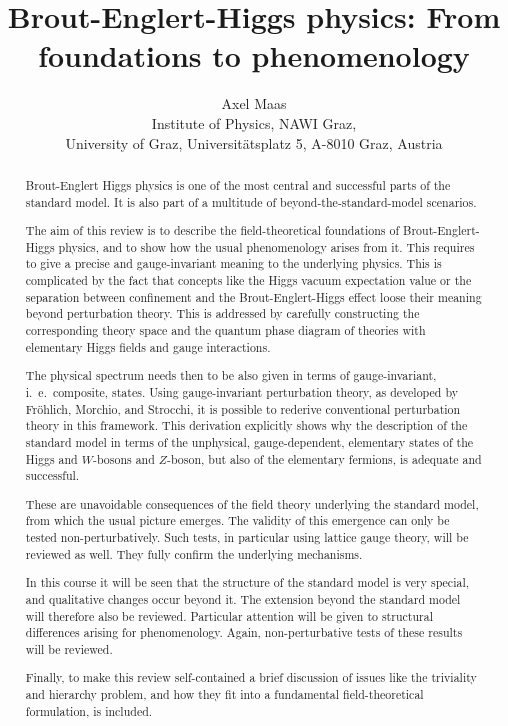\documentclass[final,twoside,12pt]{article}
\newcommand*{\1}{1\!\!\!\bot}
\begin{document}
 
\title{Brout-Englert-Higgs physics: From foundations to phenomenology}%

\author{Axel Maas\\
Institute of Physics, NAWI Graz,\\ University of Graz, Universit\"atsplatz 5, A-8010 Graz, Austria}

\maketitle

\begin{abstract}

Brout-Englert Higgs physics is one of the most central and successful parts of the standard model. It is also part of a multitude of beyond-the-standard-model scenarios.

The aim of this review is to describe the field-theoretical foundations of Brout-Englert-Higgs physics, and to show how the usual phenomenology arises from it. This requires to give a precise and gauge-invariant meaning to the underlying physics. This is complicated by the fact that concepts like the Higgs vacuum expectation value or the separation between confinement and the Brout-Englert-Higgs effect loose their meaning beyond perturbation theory. This is addressed by carefully constructing the corresponding theory space and the quantum phase diagram of theories with elementary Higgs fields and gauge interactions.

The physical spectrum needs then to be also given in terms of gauge-invariant, i.\ e.\ composite, states. Using gauge-invariant perturbation theory, as developed by Fr\"ohlich, Morchio, and Strocchi, it is possible to rederive conventional perturbation theory in this framework. This derivation explicitly shows why the description of the standard model in terms of the unphysical, gauge-dependent, elementary states of the Higgs and $W$-bosons and $Z$-boson, but also of the elementary fermions, is adequate and successful.

These are unavoidable consequences of the field theory underlying the standard model, from which the usual picture emerges. The validity of this emergence can only be tested non-perturbatively. Such tests, in particular using lattice gauge theory, will be reviewed as well. They fully confirm the underlying mechanisms.

In this course it will be seen that the structure of the standard model is very special, and qualitative changes occur beyond it. The extension beyond the standard model will therefore also be reviewed. Particular attention will be given to structural differences arising for phenomenology. Again, non-perturbative tests of these results will be reviewed.

Finally, to make this review self-contained a brief discussion of issues like the triviality and hierarchy problem, and how they fit into a fundamental field-theoretical formulation, is included.

\end{abstract}
\end{document}
